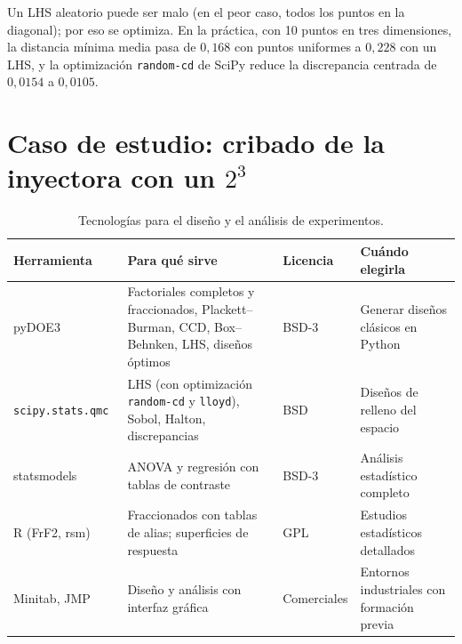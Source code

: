Un LHS aleatorio puede ser malo (en el peor caso, todos los puntos en la diagonal); por eso se optimiza. En la práctica, con 10 puntos en tres dimensiones, la distancia mínima media pasa de $0{,}168$ con puntos uniformes a $0{,}228$ con un LHS, y la optimización \texttt{random-cd} de SciPy reduce la discrepancia centrada de $0{,}0154$ a $0{,}0105$.

\section{Caso de estudio: cribado de la inyectora con un \texorpdfstring{$2^3$}{2\^{}3}}

\addtocounter{definicion}{1}%

\begin{table}[ht]
\centering\small
\begin{tabularx}{\textwidth}{@{}>{\raggedright\arraybackslash}p{2.7cm}>{\raggedright\arraybackslash}X>{\raggedright\arraybackslash}p{2.1cm}>{\raggedright\arraybackslash}p{3.4cm}@{}}
\toprule
Herramienta & Para qué sirve & Licencia & Cuándo elegirla \\
\midrule
pyDOE3~\cite{pydoe3} & Factoriales completos y fraccionados, Plackett--Burman, CCD, Box--Behnken, LHS, diseños óptimos & BSD-3 & Generar diseños clásicos en Python \\
\texttt{scipy.\allowbreak stats.\allowbreak qmc}~\cite{scipyqmc} & LHS (con optimización \texttt{random-cd} y \texttt{lloyd}), Sobol, Halton, discrepancias & BSD & Diseños de relleno del espacio \\
statsmodels & ANOVA y regresión con tablas de contraste & BSD-3 & Análisis estadístico completo \\
R (FrF2, rsm) & Fraccionados con tablas de alias; superficies de respuesta & GPL & Estudios estadísticos detallados \\
Minitab, JMP & Diseño y análisis con interfaz gráfica & Comerciales & Entornos industriales con formación previa \\
\bottomrule
\end{tabularx}
\caption{Tecnologías para el diseño y el análisis de experimentos.}
\label{tab:tec2}
\end{table}

\addtocounter{definicion}{1}%

